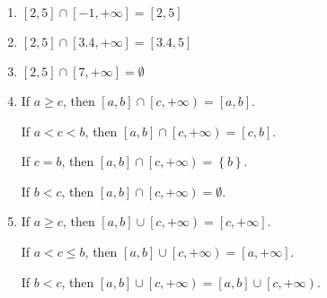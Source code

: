 \documentclass[11pt]{article}
\begin{document}
\begin{enumerate}
  \item $\left[ 2, 5 \right] \cap \left[ -1, +\infty \right] = \left[ 2, 5 \right]$
  \item $\left[ 2, 5 \right] \cap \left[ 3.4, +\infty \right] = \left[ 3.4, 5 \right]$
  \item $\left[ 2, 5 \right] \cap \left[ 7, +\infty \right] = \emptyset$
  \item If $a \geq c$, then $\left[ a, b \right] \cap \left[ c, +\infty \right) = \left[ a, b \right]$. 

If $a < c < b$, then $\left[ a, b \right] \cap \left[ c, +\infty \right) = \left[ c, b \right]$.

If $c = b$, then $\left[ a, b \right] \cap \left[ c, +\infty \right) = \left\{ b \right\}$.

If $b < c$, then $\left[ a, b \right] \cap \left[ c, +\infty \right) = \emptyset$.

  \item If $a \geq c$, then $\left[ a, b \right] \cup \left[ c, +\infty \right) = \left[ c, +\infty \right]$. 

If $a < c \leq b$, then $\left[ a, b \right] \cup \left[ c, +\infty \right) = \left[ a, +\infty \right]$.

If $b < c$, then $\left[ a, b \right] \cup \left[ c, +\infty \right) = \left[ a, b \right] \cup \left[ c, +\infty \right)$.

\end{enumerate}
\end{document}
